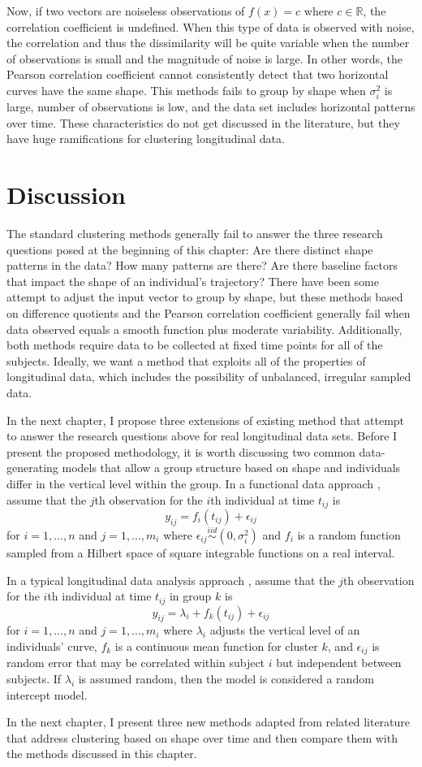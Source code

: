 Now, if two vectors are noiseless observations of $f(x)=c$ where $c\in\mathbb{R}$,  the correlation coefficient is undefined. When this type of data is observed with noise, the correlation and thus the dissimilarity will be quite variable when the number of observations is small and the magnitude of noise is large. In other words, the Pearson correlation coefficient cannot consistently detect that two horizontal curves have the same shape. This methods fails to group by shape when $\sigma_{i}^{2}$ is large, number of observations is low, and the data set includes horizontal patterns over time. These characteristics do not get discussed in the literature, but they have huge ramifications for clustering longitudinal data.

\section{Discussion}
The standard clustering methods generally fail to answer the three research questions posed at the beginning of this chapter: Are there distinct shape patterns in the data? How many patterns are there? Are there baseline factors that impact the shape of an individual's trajectory? There have been some attempt to adjust the input vector to group by shape, but these methods based on difference quotients and the Pearson correlation coefficient generally fail when data observed equals a smooth function plus moderate variability. Additionally, both methods require data to be collected at fixed time points for all of the subjects. Ideally, we want a method that exploits all of the properties of longitudinal data, which includes the possibility of unbalanced, irregular sampled data.

In the next chapter, I propose three extensions of existing method that attempt to answer the research questions above for real longitudinal data sets. Before I present the proposed methodology, it is worth discussing two common data-generating models that allow a group structure based on shape and individuals differ in the vertical level within the group. In a functional data approach \cite{ramsay2002}, assume that the $j$th observation for the $i$th individual at time $t_{ij}$ is
$$y_{ij}= f_i(t_{ij})+\epsilon_{ij}$$
for $i=1,...,n$ and $j=1,...,m_{i}$ where $\epsilon_{ij}\overset{iid}{\sim} (0,\sigma_{i}^{2})$ and $f_{i}$ is a random function sampled from a Hilbert space of square integrable functions on a real interval. 

In a typical longitudinal data analysis approach \cite{diggle2002}, assume that the $j$th observation for the $i$th individual at time $t_{ij}$ in group $k$ is
$$y_{ij}=\lambda_{i}+f_k(t_{ij})+\epsilon_{ij}$$
for $i=1,...,n$ and $j=1,...,m_{i}$ where $\lambda_{i}$ adjusts the vertical level of an individuals' curve, $f_k$ is a continuous mean function for cluster $k$, and $\epsilon_{ij}$ is random error that may be correlated within subject $i$ but independent between subjects. If $\lambda_{i}$ is assumed random, then the model is considered a random intercept model. 

 In the next chapter, I present three new methods adapted from related literature that address clustering based on shape over time and then compare them with the methods discussed in this chapter.	
